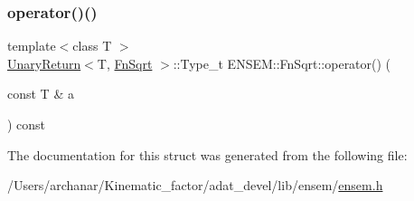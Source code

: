 \mbox{\label{structENSEM_1_1FnSqrt_acec9d842c8abf3aff70bc3c16a5473ce}} 
\subsubsection{\texorpdfstring{operator()()}{operator()()}\hspace{0.1cm}{\footnotesize\ttfamily [2/2]}}
{\footnotesize\ttfamily template$<$class T $>$ \\
\mbox{\hyperlink{structENSEM_1_1UnaryReturn}{Unary\+Return}}$<$T, \mbox{\hyperlink{structENSEM_1_1FnSqrt}{Fn\+Sqrt}} $>$\+::Type\+\_\+t E\+N\+S\+E\+M\+::\+Fn\+Sqrt\+::operator() (\begin{DoxyParamCaption}\item[{const T \&}]{a }\end{DoxyParamCaption}) const\hspace{0.3cm}{\ttfamily [inline]}}



The documentation for this struct was generated from the following file\+:\begin{DoxyCompactItemize}
\item 
/\+Users/archanar/\+Kinematic\+\_\+factor/adat\+\_\+devel/lib/ensem/\mbox{\hyperlink{lib_2ensem_2ensem_8h}{ensem.\+h}}\end{DoxyCompactItemize}
